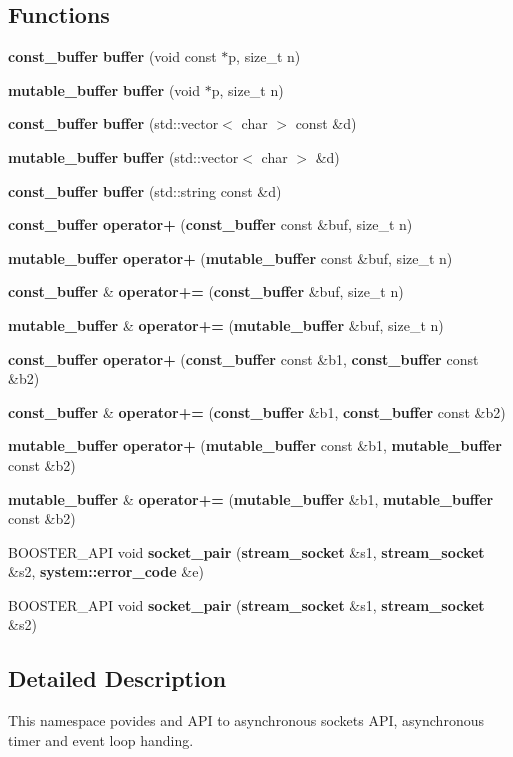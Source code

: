 \subsection*{Functions}
\begin{DoxyCompactItemize}
\item 
{\bf const\-\_\-buffer} {\bf buffer} (void const $\ast$p, size\-\_\-t n)
\item 
{\bf mutable\-\_\-buffer} {\bf buffer} (void $\ast$p, size\-\_\-t n)
\item 
{\bf const\-\_\-buffer} {\bf buffer} (std\-::vector$<$ char $>$ const \&d)
\item 
{\bf mutable\-\_\-buffer} {\bf buffer} (std\-::vector$<$ char $>$ \&d)
\item 
{\bf const\-\_\-buffer} {\bf buffer} (std\-::string const \&d)
\item 
{\bf const\-\_\-buffer} {\bf operator+} ({\bf const\-\_\-buffer} const \&buf, size\-\_\-t n)
\item 
{\bf mutable\-\_\-buffer} {\bf operator+} ({\bf mutable\-\_\-buffer} const \&buf, size\-\_\-t n)
\item 
{\bf const\-\_\-buffer} \& {\bf operator+=} ({\bf const\-\_\-buffer} \&buf, size\-\_\-t n)
\item 
{\bf mutable\-\_\-buffer} \& {\bf operator+=} ({\bf mutable\-\_\-buffer} \&buf, size\-\_\-t n)
\item 
{\bf const\-\_\-buffer} {\bf operator+} ({\bf const\-\_\-buffer} const \&b1, {\bf const\-\_\-buffer} const \&b2)
\item 
{\bf const\-\_\-buffer} \& {\bf operator+=} ({\bf const\-\_\-buffer} \&b1, {\bf const\-\_\-buffer} const \&b2)
\item 
{\bf mutable\-\_\-buffer} {\bf operator+} ({\bf mutable\-\_\-buffer} const \&b1, {\bf mutable\-\_\-buffer} const \&b2)
\item 
{\bf mutable\-\_\-buffer} \& {\bf operator+=} ({\bf mutable\-\_\-buffer} \&b1, {\bf mutable\-\_\-buffer} const \&b2)
\item 
B\-O\-O\-S\-T\-E\-R\-\_\-\-A\-P\-I void {\bf socket\-\_\-pair} ({\bf stream\-\_\-socket} \&s1, {\bf stream\-\_\-socket} \&s2, {\bf system\-::error\-\_\-code} \&e)
\item 
B\-O\-O\-S\-T\-E\-R\-\_\-\-A\-P\-I void {\bf socket\-\_\-pair} ({\bf stream\-\_\-socket} \&s1, {\bf stream\-\_\-socket} \&s2)
\end{DoxyCompactItemize}


\subsection{Detailed Description}
This namespace povides and A\-P\-I to asynchronous sockets A\-P\-I, asynchronous timer and event loop handing. 

